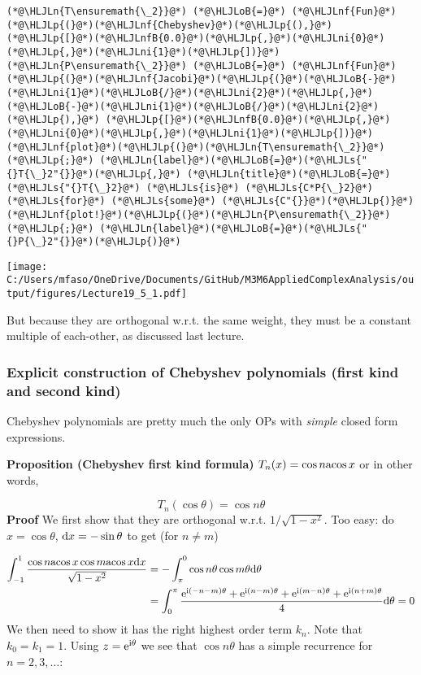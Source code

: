 \documentclass[12pt,a4paper]{article}
\newcommand{\HLJLn}[1]{#1}
\newcommand{\HLJLnf}[1]{\textcolor[RGB]{66,102,213}{#1}}
\newcommand{\HLJLs}[1]{\textcolor[RGB]{201,61,57}{#1}}
\newcommand{\HLJLnfB}[1]{\textcolor[RGB]{59,151,46}{#1}}
\newcommand{\HLJLni}[1]{\textcolor[RGB]{59,151,46}{#1}}
\newcommand{\HLJLoB}[1]{\textcolor[RGB]{102,102,102}{\textbf{#1}}}
\newcommand{\HLJLp}[1]{#1}
\def\D{ {\rm d} }
\def\I{ {\rm i} }
\def\E{ {\rm e} }
\def\acos{ {\rm acos}\, }
\def\addtab#1={#1\;&=}
\def\ccr{\\\addtab}
\def\dx{\D x}
\def\addtab#1={#1\;&=}
\def\ccr{\\\addtab}
\begin{document}
\begin{lstlisting}
(*@\HLJLn{T\ensuremath{\_2}}@*) (*@\HLJLoB{=}@*) (*@\HLJLnf{Fun}@*)(*@\HLJLp{(}@*)(*@\HLJLnf{Chebyshev}@*)(*@\HLJLp{(),}@*) (*@\HLJLp{[}@*)(*@\HLJLnfB{0.0}@*)(*@\HLJLp{,}@*)(*@\HLJLni{0}@*)(*@\HLJLp{,}@*)(*@\HLJLni{1}@*)(*@\HLJLp{])}@*)
(*@\HLJLn{P\ensuremath{\_2}}@*) (*@\HLJLoB{=}@*) (*@\HLJLnf{Fun}@*)(*@\HLJLp{(}@*)(*@\HLJLnf{Jacobi}@*)(*@\HLJLp{(}@*)(*@\HLJLoB{-}@*)(*@\HLJLni{1}@*)(*@\HLJLoB{/}@*)(*@\HLJLni{2}@*)(*@\HLJLp{,}@*)(*@\HLJLoB{-}@*)(*@\HLJLni{1}@*)(*@\HLJLoB{/}@*)(*@\HLJLni{2}@*)(*@\HLJLp{),}@*) (*@\HLJLp{[}@*)(*@\HLJLnfB{0.0}@*)(*@\HLJLp{,}@*)(*@\HLJLni{0}@*)(*@\HLJLp{,}@*)(*@\HLJLni{1}@*)(*@\HLJLp{])}@*)
(*@\HLJLnf{plot}@*)(*@\HLJLp{(}@*)(*@\HLJLn{T\ensuremath{\_2}}@*)(*@\HLJLp{;}@*) (*@\HLJLn{label}@*)(*@\HLJLoB{=}@*)(*@\HLJLs{"{}T{\_}2"{}}@*)(*@\HLJLp{,}@*) (*@\HLJLn{title}@*)(*@\HLJLoB{=}@*)(*@\HLJLs{"{}T{\_}2}@*) (*@\HLJLs{is}@*) (*@\HLJLs{C*P{\_}2}@*) (*@\HLJLs{for}@*) (*@\HLJLs{some}@*) (*@\HLJLs{C"{}}@*)(*@\HLJLp{)}@*)
(*@\HLJLnf{plot!}@*)(*@\HLJLp{(}@*)(*@\HLJLn{P\ensuremath{\_2}}@*)(*@\HLJLp{;}@*) (*@\HLJLn{label}@*)(*@\HLJLoB{=}@*)(*@\HLJLs{"{}P{\_}2"{}}@*)(*@\HLJLp{)}@*)
\end{lstlisting}

\texttt{[image: C:/Users/mfaso/OneDrive/Documents/GitHub/M3M6AppliedComplexAnalysis/output/figures/Lecture19\_5\_1.pdf]}

But because they are orthogonal w.r.t. the same weight, they must be a constant multiple of each-other, as discussed last lecture.

\subsubsection{Explicit construction of Chebyshev polynomials (first kind and second kind)}
Chebyshev polynomials are pretty much the only OPs with \emph{simple} closed form expressions.

\textbf{Proposition (Chebyshev first kind formula)} $T_n(x) = \cos n \acos x$ or in other words,

\[
T_n(\cos \theta) = \cos n \theta
\]
\textbf{Proof} We first show that they are orthogonal w.r.t. $1/\sqrt{1-x^2}$. Too easy: do $x = \cos \theta$, $\dx = -\sin \theta$ to get (for $n \neq m$)


\begin{align*}
    \int_{-1}^1 {\cos n \acos x \cos m \acos x \dx \over \sqrt{1-x^2}} &= -\int_\pi^0  \cos n \theta \cos m \theta \D \theta \ccr
    =  \int_0^\pi  {\E^{\I (-n-m)\theta} + \E^{\I (n-m)\theta} + \E^{\I (m-n)\theta} + \E^{\I (n+m)\theta}    \over 4} \D \theta =0
\end{align*}
We then need to show it has the right highest order term $k_n$. Note that $k_0 = k_1 = 1$.  Using $z = \E^{\I \theta}$ we see that $\cos n \theta$ has a simple recurrence for $n=2,3,\ldots$:
\end{document}
